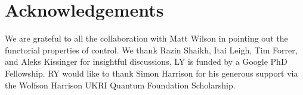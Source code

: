 \section{Acknowledgements}
We are grateful to all the collaboration with Matt Wilson in pointing out the functorial properties of control. We thank Razin Shaikh, Itai Leigh, Tim Forrer, and Aleks Kissinger for insightful discussions.
LY is funded by a Google PhD Fellowship.
RY would like to thank Simon Harrison for his generous support via the Wolfson Harrison UKRI Quantum Foundation Scholarship.
